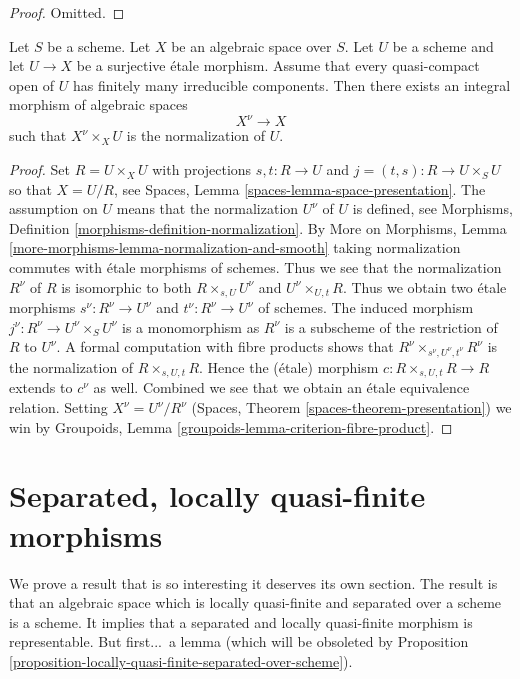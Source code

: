 \begin{proof}
Omitted.
\end{proof}

\begin{lemma}
\label{lemma-normalization}
Let $S$ be a scheme. Let $X$ be an algebraic space over $S$.
Let $U$ be a scheme and let $U \to X$ be a surjective \'etale morphism.
Assume that every quasi-compact open of $U$ has finitely many
irreducible components. Then there exists an integral morphism
of algebraic spaces
$$
X^\nu \longrightarrow X
$$
such that $X^\nu \times_X U$ is the normalization of $U$.
\end{lemma}

\begin{proof}
Set $R = U \times_X U$ with projections $s, t : R \to U$ and
$j = (t, s) : R \to U \times_S U$ so that $X = U/R$, see
Spaces, Lemma \ref{spaces-lemma-space-presentation}.
The assumption on $U$ means that the normalization $U^\nu$ of $U$
is defined, see Morphisms, Definition
\ref{morphisms-definition-normalization}.
By More on Morphisms, Lemma
\ref{more-morphisms-lemma-normalization-and-smooth}
taking normalization commutes with \'etale morphisms of schemes.
Thus we see that the normalization $R^\nu$ of $R$
is isomorphic to both $R \times_{s, U} U^\nu$ and $U^\nu \times_{U, t} R$.
Thus we obtain two \'etale morphisms
$s^\nu : R^\nu \to U^\nu$ and $t^\nu : R^\nu \to U^\nu$
of schemes. The induced morphism $j^\nu : R^\nu \to U^\nu \times_S U^\nu$
is a monomorphism as $R^\nu$ is a subscheme of the restriction of
$R$ to $U^\nu$. A formal computation with fibre products shows that
$R^\nu \times_{s^\nu, U^\nu, t^\nu} R^\nu$ is the normalization
of $R \times_{s, U, t} R$. Hence the (\'etale) morphism
$c : R \times_{s, U, t} R \to R$ extends to $c^\nu$ as well.
Combined we see that we obtain an \'etale equivalence relation.
Setting $X^\nu = U^\nu/R^\nu$
(Spaces, Theorem \ref{spaces-theorem-presentation})
we win by
Groupoids, Lemma \ref{groupoids-lemma-criterion-fibre-product}.
\end{proof}







\section{Separated, locally quasi-finite morphisms}
\label{section-schemehood}

\noindent
We prove a result that is so interesting it deserves its own section.
The result is that an algebraic space which is locally quasi-finite and
separated over a scheme is a scheme. It implies that a separated
and locally quasi-finite morphism is representable. But first...\ a lemma
(which will be obsoleted by
Proposition \ref{proposition-locally-quasi-finite-separated-over-scheme}).

